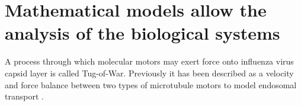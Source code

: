 \section{Mathematical models allow the analysis of the biological systems}

A process through which molecular motors may exert force onto influenza virus capsid layer is called Tug-of-War. Previously it has been described as a velocity and force balance between two types of microtubule motors to model endosomal transport \cite{muller2008tug}.



